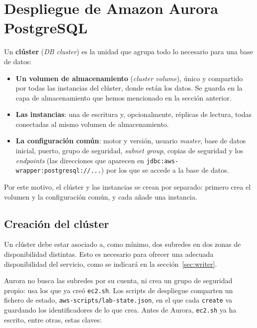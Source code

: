 \documentclass[12pt,a4paper]{article}
\begin{document}
\section{Despliegue de Amazon Aurora PostgreSQL}\label{sec:despliegue}

Un \textbf{clúster} (\textit{DB cluster}) es la unidad que agrupa todo lo necesario para una base de datos:
\begin{itemize}
    \item \textbf{Un volumen de almacenamiento} (\textit{cluster volume}), único y compartido por todas las instancias del clúster, donde están los datos. Se guarda en la capa de almacenamiento que hemos mencionado en la sección anterior.
    
    \item \textbf{Las instancias}: una de escritura y, opcionalmente, réplicas de lectura, todas conectadas al mismo volumen de almacenamiento. 
    
    \item \textbf{La configuración común}: motor y versión, usuario \textit{master}, base de datos inicial, puerto, grupo de seguridad, \textit{subnet group}, copias de seguridad y los \textit{endpoints} (las direcciones que aparecen en \texttt{jdbc:aws-wrapper:postgresql://...}) por los que se accede a la base de datos.
\end{itemize}

Por este motivo, el clúster y las instancias se crean por separado: primero \texttt{} crea el volumen y la configuración común, y cada \texttt{} añade una instancia. 

\subsection{Creación del clúster}\label{sec:cluster}

Un clúster debe estar asociado a, como mínimo, dos subredes en dos zonas de disponibilidad distintas. Esto es necesario para ofrecer una adecuada disponibilidad del servicio, como se indicará en la sección~\ref{sec:writer}.

Aurora no busca las subredes por su cuenta, ni crea un grupo de seguridad propio: usa los que ya creó \texttt{ec2.sh}. Los scripts de despliegue comparten un fichero de estado, \texttt{aws-scripts/lab-state.json}, en el que cada \texttt{create} va guardando los identificadores de lo que crea. Antes de Aurora, \texttt{ec2.sh} ya ha escrito, entre otras, estas claves:
\end{document}
